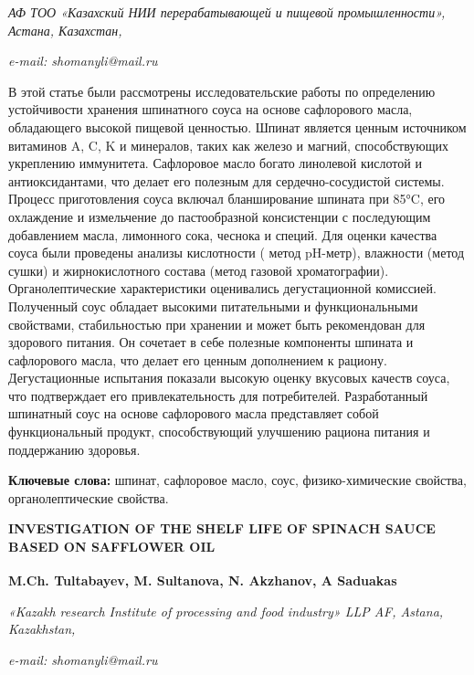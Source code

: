 \begin{affiliation}
\emph{АФ ТОО «Казахский НИИ перерабатывающей и пищевой промышленности», Астана, Казахстан,}

\emph{e-mail: shomanyli@mail.ru}
\end{affiliation}

В этой статье были рассмотрены исследовательские работы по определению
устойчивости хранения шпинатного соуса на основе сафлорового масла,
обладающего высокой пищевой ценностью. Шпинат является ценным источником
витаминов A, C, K и минералов, таких как железо и магний, способствующих
укреплению иммунитета. Сафлоровое масло богато линолевой кислотой и
антиоксидантами, что делает его полезным для сердечно-сосудистой
системы. Процесс приготовления соуса включал бланширование шпината при
85°C, его охлаждение и измельчение до пастообразной консистенции с
последующим добавлением масла, лимонного сока, чеснока и специй. Для
оценки качества соуса были проведены анализы кислотности ( метод
pH-метр), влажности (метод сушки) и жирнокислотного состава (метод
газовой хроматографии). Органолептические характеристики оценивались
дегустационной комиссией. Полученный соус обладает высокими питательными
и функциональными свойствами, стабильностью при хранении и может быть
рекомендован для здорового питания. Он сочетает в себе полезные
компоненты шпината и сафлорового масла, что делает его ценным
дополнением к рациону. Дегустационные испытания показали высокую оценку
вкусовых качеств соуса, что подтверждает его привлекательность для
потребителей. Разработанный шпинатный соус на основе сафлорового масла
представляет собой функциональный продукт, способствующий улучшению
рациона питания и поддержанию здоровья.

{\bfseries Ключевые слова:} шпинат, сафлоровое масло, соус,
физико-химические свойства, органолептические свойства.

\begin{articleheader}
{\bfseries INVESTIGATION OF THE SHELF LIFE OF SPINACH SAUCE BASED ON SAFFLOWER OIL}

{\bfseries
M.Ch. Tultabayev\textsuperscript{\envelope },
M. Sultanova,
N. Akzhanov,
A Saduakas}
\end{articleheader}

\begin{affiliation}
\emph{«Kazakh research Institute of processing and food industry» LLP AF, Astana, Kazakhstan,}

\emph{e-mail: shomanyli@mail.ru}
\end{affiliation}

